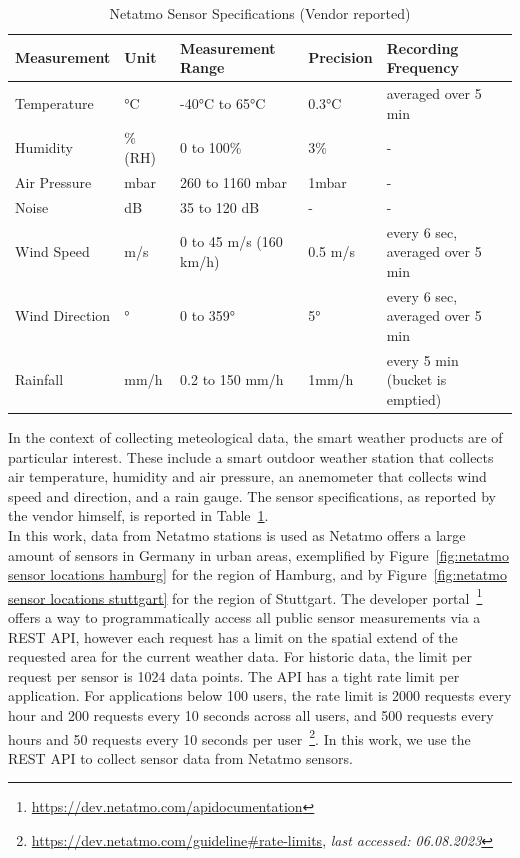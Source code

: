 \begin{table}[]
\begin{tabular}{@{}lllll@{}}
\toprule
Measurement    & Unit    & Measurement Range      & Precision  & Recording Frequency              \\ \midrule
Temperature    & °C      & -40°C to 65°C          & 0.3°C   & averaged over 5 min              \\
Humidity       & \% (RH) & 0 to 100\%             & 3\%     & -                                \\
Air Pressure   & mbar    & 260 to 1160 mbar       & 1mbar   & -                                \\
Noise          & dB      & 35 to 120 dB           & -       & -                                \\
Wind Speed     & m/s     & 0 to 45 m/s (160 km/h) & 0.5 m/s & every 6 sec, averaged over 5 min \\
Wind Direction & °       & 0 to 359°              & 5°      & every 6 sec, averaged over 5 min \\
Rainfall       & mm/h    & 0.2 to 150 mm/h        & 1mm/h   & every 5 min (bucket is emptied)  \\ \bottomrule
\end{tabular}
\caption{Netatmo Sensor Specifications (Vendor reported)}
\label{tab: netatmo sensor specs}
\end{table}

In the context of collecting meteological data, the smart weather products are of particular interest. These include a smart outdoor weather station that collects air temperature, humidity and air pressure, an anemometer that collects wind speed and direction, and a rain gauge. The sensor specifications, as reported by the vendor himself, is reported in Table~\ref{tab: netatmo sensor specs}.\\
In this work, data from Netatmo stations is used as Netatmo offers a large amount of sensors in Germany in urban areas, exemplified by Figure~\ref{fig:netatmo sensor locations hamburg} for the region of Hamburg, and by Figure~\ref{fig:netatmo sensor locations stuttgart} for the region of Stuttgart.
The developer portal~\footnote{\url{https://dev.netatmo.com/apidocumentation}} offers a way to programmatically access all public sensor measurements via a REST API, however each request has a limit on the spatial extend of the requested area for the current weather data. For historic data, the limit per request per sensor is 1024 data points. The API has a tight rate limit per application. For applications below 100 users, the rate limit is 2000 requests every hour and 200 requests every 10 seconds across all users, and 500 requests every hours and 50 requests every 10 seconds per user~\footnote{\url{https://dev.netatmo.com/guideline\#rate-limits}, \textit{last accessed: 06.08.2023}}. In this work, we use the REST API to collect sensor data from Netatmo sensors.

